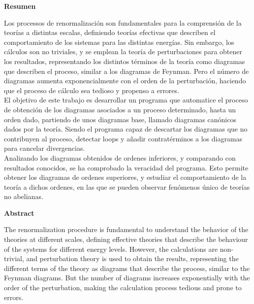 \documentclass[11pt,a4paper,twoside,pdf]{article}
\numberwithin{equation}{section}
\begin{document}
\newpage
%
\begin{center}
{\bf Resumen}
\bigskip

\begin{minipage}{0.8\linewidth}
Los processos de renormalización son fundamentales para la comprensión de la 
teorías a distintas escalas, definiendo teorías efectivas que describen el
comportamiento de los sistemas para las distintas energías. Sin embargo, los 
cálculos son no triviales, y se emplean la teoría de perturbaciones para obtener
los resultados, representando los distintos términos de la teoría como diagramas 
que describen el proceso, similar a los diagramas de Feynman. Pero el número de
diagramas aumenta exponencialmente con el orden de la perturbación, haciendo que
el proceso de cálculo sea tedioso y propenso a errores. \\

El objetivo de este trabajo es desarrollar un programa que automatice el proceso
de obtención de los diagramas asociados a un proceso determinado, hasta un orden
dado, partiendo de unos diagramas base, llamado diagramas canónicos dados por la 
teoría. Siendo el programa capaz de descartar los diagramas que no contribuyen al 
proceso, detectar loops y añadir contratérminos a los diagramas para cancelar 
divergencias. \\

Analizando los diagramas obtenidos de ordenes inferiores, y comparando con 
resultados conocidos, se ha comprobado la veracidad del programa. Esto permite
obtener los diagramas de ordenes superiores, y estudiar el comportamiento de la 
teoría a dichos ordenes, en las que se pueden observar fenómenos único de teorías 
no abelianas.

\end{minipage}

\newpage

{\bf Abstract} 
\bigskip

\begin{minipage}{0.8\linewidth}
The renormalization procedure is fundamental to understand the behavior of the 
theories at different scales, defining effective theories that describe the
behaviour of the systems for different energy levels. However, the calculations are
non-trivial, and perturbation theory is used to obtain the results, representing
the different terms of the theory as diagrams that describe the process, similar
to the Feynman diagrams. But the number of diagrams increases exponentially with
the order of the perturbation, making the calculation process tedious and prone to
errors. \\


\end{minipage}
\end{center}
\end{document}
